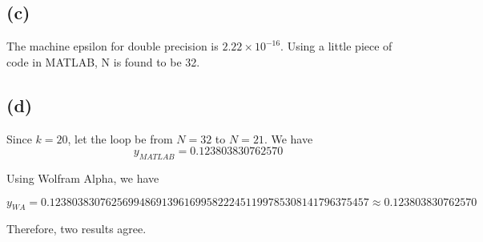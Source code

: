 \documentclass[a4paper, 12pt]{article}
\begin{document}
\subsection*{(c)}

The machine epsilon for double precision is $2.22\times 10^{-16}$. Using a little piece of code in MATLAB, N is found to be 32.


\subsection*{(d)}
Since $k = 20$, let the loop be from $N = 32$ to $N = 21$. We have
\[y_{MATLAB} = 0.123803830762570\]

Using Wolfram Alpha, we have

\[y_{WA} = 0.123803830762569948691396169958222451199785308141796375457 \approx 0.123803830762570\]

Therefore, two results agree.



%



%
\end{document}
